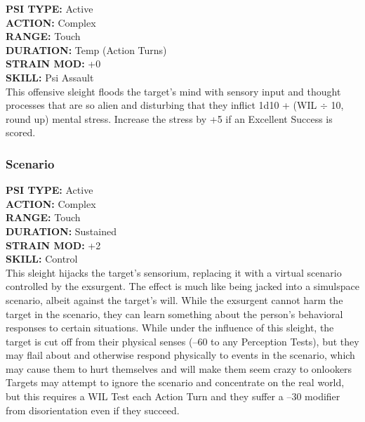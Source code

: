  \textbf{PSI TYPE:} Active \\ \textbf{ACTION:} Complex \\ \textbf{RANGE:} Touch \\ \textbf{DURATION:} Temp (Action Turns) \\ \textbf{STRAIN MOD:} +0 \\ \textbf{SKILL:} Psi Assault \\ This offensive sleight floods the target's mind with sensory input and thought processes that are so alien and disturbing that they inflict 1d10 + (WIL $\div$ 10, round up) mental stress. Increase the stress by +5 if an Excellent Success is scored. 

\subsubsection{Scenario } \textbf{PSI TYPE:} Active \\ \textbf{ACTION:} Complex \\ \textbf{RANGE:} Touch \\ \textbf{DURATION:} Sustained \\ \textbf{STRAIN MOD:} +2 \\ \textbf{SKILL:} Control \\ This sleight hijacks the target's sensorium, replacing it with a virtual scenario controlled by the exsurgent. The effect is much like being jacked into a simulspace scenario, albeit against the target's will. While the exsurgent cannot harm the target in the scenario, they can learn something about the person's behavioral responses to certain situations. While under the influence of this sleight, the target is cut off from their physical senses (–60 to any Perception Tests), but they may flail about and otherwise respond physically to events in the scenario, which may cause them to hurt themselves and will make them seem crazy to onlookers Targets may attempt to ignore the scenario and concentrate on the real world, but this requires a WIL Test each Action Turn and they suffer a –30 modifier from disorientation even if they succeed. 

